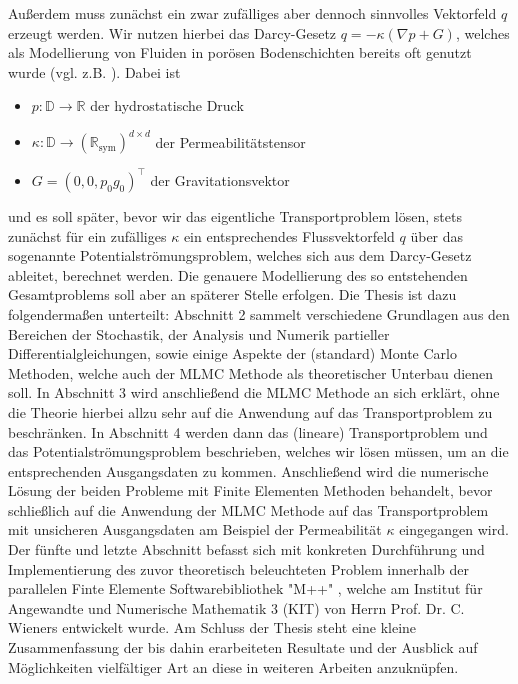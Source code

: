 \documentclass[12pt,a4paper]{scrartcl}
\numberwithin{equation}{section}
\newcommand{\R}{\mathbb{R}} %
\begin{document}
Außerdem muss zunächst ein zwar zufälliges aber dennoch sinnvolles Vektorfeld $q$ erzeugt werden. Wir nutzen hierbei das Darcy-Gesetz $q = - \kappa (\nabla p + G)$, welches als Modellierung von Fluiden in porösen Bodenschichten bereits oft genutzt wurde (vgl. z.B. \cite{de1986quantitative}).
Dabei ist 
\begin{itemize}
	\item $p:\mathbb{D} \rightarrow \R$ der hydrostatische Druck
	\item $\kappa: \mathbb{D} \rightarrow (\R_{\text{sym}})^{d \times d}$ der Permeabilitätstensor 
	\item $G = (0,0,p_0 g_0)^{\top}$ der Gravitationsvektor	
\end{itemize}
und es soll später, bevor wir das eigentliche Transportproblem lösen, stets zunächst für ein zufälliges $\kappa$ ein entsprechendes Flussvektorfeld $q$ über das sogenannte Potentialströmungsproblem, welches sich aus dem Darcy-Gesetz ableitet, berechnet werden. 
Die genauere Modellierung des so entstehenden Gesamtproblems soll aber an späterer Stelle erfolgen. \newline
Die Thesis ist dazu folgendermaßen unterteilt:\newline 
Abschnitt 2 sammelt verschiedene Grundlagen aus den Bereichen der Stochastik, der Analysis und Numerik partieller Differentialgleichungen, sowie einige Aspekte der (standard) Monte Carlo Methoden, welche auch der MLMC Methode als theoretischer Unterbau dienen soll. \newline
In Abschnitt 3 wird anschließend die MLMC Methode an sich erklärt, ohne die Theorie hierbei allzu sehr auf die Anwendung auf das Transportproblem zu beschränken. \newline
In Abschnitt 4 werden dann das (lineare) Transportproblem und das Potentialströmungsproblem beschrieben, welches wir lösen müssen, um an die entsprechenden Ausgangsdaten zu kommen. Anschließend wird die numerische Lösung der beiden Probleme mit Finite Elementen Methoden behandelt, bevor schließlich auf die Anwendung der MLMC Methode auf das Transportproblem mit unsicheren Ausgangsdaten am Beispiel der Permeabilität $\kappa$ eingegangen wird. \newline
Der fünfte und letzte Abschnitt befasst sich mit konkreten Durchführung und Implementierung des zuvor theoretisch beleuchteten Problem innerhalb der parallelen Finte Elemente Softwarebibliothek "M++" \cite{siteM++},
welche am Institut für Angewandte und Numerische Mathematik 3 (KIT) von Herrn Prof. Dr. C. Wieners entwickelt wurde. \newline
Am Schluss der Thesis steht eine kleine Zusammenfassung der bis dahin erarbeiteten Resultate und der Ausblick auf Möglichkeiten vielfältiger Art an diese in weiteren Arbeiten anzuknüpfen.
\end{document}
